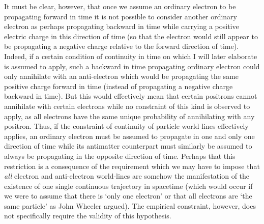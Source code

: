 \documentclass[notitlepage,12pt]{report}
\begin{document}
It must be clear, however, that once we assume an ordinary electron to be propagating forward in time it is not possible to consider another ordinary electron as perhaps propagating backward in time while carrying a positive electric charge in this direction of time (so that the electron would still appear to be propagating a negative charge relative to the forward direction of time). Indeed, if a certain condition of continuity in time on which I will later elaborate is assumed to apply, such a backward in time propagating ordinary electron could only annihilate with an anti-electron which would be propagating the same positive charge forward in time (instead of propagating a negative charge backward in time). But this would effectively mean that certain positrons cannot annihilate with certain electrons while no constraint of this kind is observed to apply, as all electrons have the same unique probability of annihilating with any positron. Thus, if the constraint of continuity of particle world lines effectively applies, an ordinary electron must be assumed to propagate in one and only one direction of time while its antimatter counterpart must similarly be assumed to always be propagating in the opposite direction of time. Perhaps that this restriction is a consequence of the requirement which we may have to impose that \textit{all} electron and anti-electron world-lines are somehow the manifestation of the existence of one single continuous trajectory in spacetime (which would occur if we were to assume that there is `only one electron' or that all electrons are `the same particle' as John Wheeler argued). The empirical constraint, however, does not specifically require the validity of this hypothesis.
\end{document}
